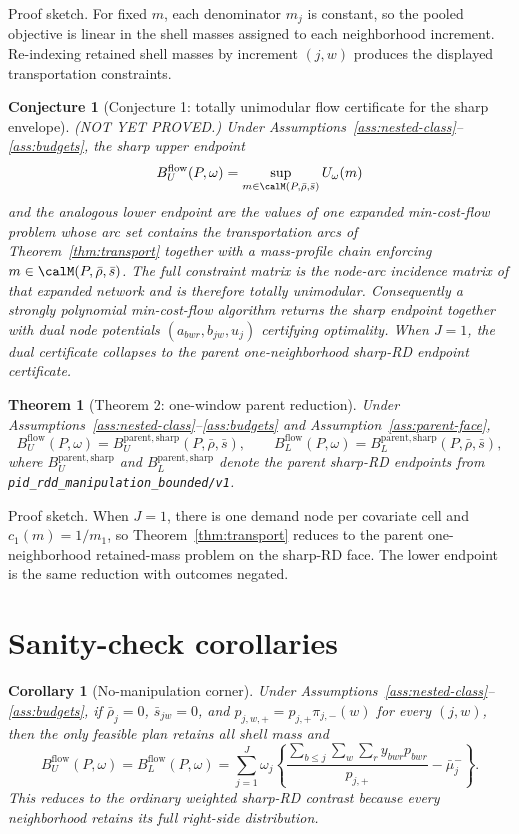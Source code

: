 \documentclass[11pt]{article}
\theoremstyle{definition}
\theoremstyle{plain}
\newtheorem{theorem}{Theorem}
\newtheorem{conjecture}{Conjecture}
\newtheorem{corollary}{Corollary}
\theoremstyle{remark}
\begin{document}
Proof sketch.  For fixed \(m\), each denominator \(m_j\) is constant, so the pooled objective is linear in
the shell masses assigned to each neighborhood increment.  Re-indexing retained shell masses by increment
\((j,w)\) produces the displayed transportation constraints.

\begin{conjecture}[Conjecture 1: totally unimodular flow certificate for the sharp envelope]\label{conj:flow}
(NOT YET PROVED.)  Under Assumptions~\ref{ass:nested-class}--\ref{ass:budgets}, the sharp upper endpoint
\[
  B_U^{\mathrm{flow}}(P,\omega)=\sup_{m\in\calM(P,\bar\rho,\bar s)} U_\omega(m)
\]
and the analogous lower endpoint are the values of one expanded min-cost-flow problem whose arc set contains
the transportation arcs of Theorem~\ref{thm:transport} together with a mass-profile chain enforcing
\(m\in\calM(P,\bar\rho,\bar s)\).  The full constraint matrix is the node-arc incidence matrix of that
expanded network and is therefore totally unimodular.  Consequently a strongly polynomial min-cost-flow
algorithm returns the sharp endpoint together with dual node potentials
\((a_{bwr},b_{jw},u_j)\) certifying optimality.  When \(J=1\), the dual certificate collapses to the parent
one-neighborhood sharp-RD endpoint certificate.
\end{conjecture}

\begin{theorem}[Theorem 2: one-window parent reduction]\label{thm:parent}
Under Assumptions~\ref{ass:nested-class}--\ref{ass:budgets} and Assumption~\ref{ass:parent-face},
\[
  B_U^{\mathrm{flow}}(P,\omega)=B_U^{\mathrm{parent,sharp}}(P,\bar\rho,\bar s),
  \qquad
  B_L^{\mathrm{flow}}(P,\omega)=B_L^{\mathrm{parent,sharp}}(P,\bar\rho,\bar s),
\]
where \(B_U^{\mathrm{parent,sharp}}\) and \(B_L^{\mathrm{parent,sharp}}\) denote the parent sharp-RD
endpoints from \texttt{pid\_rdd\_manipulation\_bounded/v1}.
\end{theorem}

Proof sketch.  When \(J=1\), there is one demand node per covariate cell and
\(c_1(m)=1/m_1\), so Theorem~\ref{thm:transport} reduces to the parent one-neighborhood retained-mass
problem on the sharp-RD face.  The lower endpoint is the same reduction with outcomes negated.

\section{Sanity-check corollaries}
\begin{corollary}[No-manipulation corner]\label{cor:no-manip}
Under Assumptions~\ref{ass:nested-class}--\ref{ass:budgets}, if \(\bar\rho_j=0\),
\(\bar s_{jw}=0\), and \(p_{j,w,+}=p_{j,+}\pi_{j,-}(w)\) for every \((j,w)\), then the only feasible plan
retains all shell mass and
\[
  B_U^{\mathrm{flow}}(P,\omega)=B_L^{\mathrm{flow}}(P,\omega)=
  \sum_{j=1}^J \omega_j\left\{\frac{\sum_{b\le j}\sum_w\sum_r y_{bwr}p_{bwr}}{p_{j,+}}-\bar\mu^-_j\right\}.
\]
This reduces to the ordinary weighted sharp-RD contrast because every neighborhood retains its full
right-side distribution.
\end{corollary}
\end{document}
